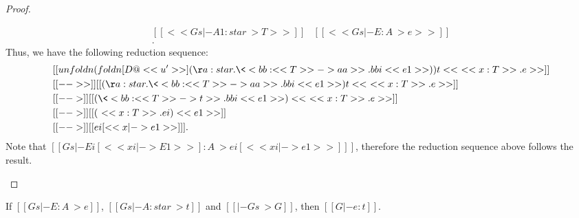 \begin{proof}
\begin{description}
\[\begin{array}{ll}
                [[<<Gs |- A1 : star ~> T>>]]
                & [[<<Gs |- E : A ~> e>>]] \\
                [[<<e' == \ <<x:T>>.e >>]].
        \end{array} \]
        Thus, we have the following reduction sequence:
        \begin{align*}
            &[[unfoldn (foldn [D@<<u'>>] (\aa:star.\<<bb : <<T>> -> aa >> . bbi
<<e1>>)) t <<\ <<x:T>>.e>>]] \\
            &[[-->>]]  [[(\aa:star.\<<bb : <<T>> -> aa >> . bbi <<e1>>) t <<\
<<x:T>>.e>>]] \\
            &[[-->]]  [[(\<<bb : <<T>> -> t >> . bbi <<e1>>) <<\ <<x:T>>.e>>]]
\\
            &[[-->]]  [[(\ <<x:T>>.ei) <<e1>>]] \\
            &[[-->]]  [[ei [<<x |-> e1>>] ]].
        \end{align*}
        Note that $[[Gs |- Ei [ << xi |-> E1 >> ] : A ~> ei [ << xi |-> e1 >> ]
]]$, therefore the reduction sequence above follows the result.
    \end{description}
\end{proof}

\begin{thm}
If $[[Gs |- E:A ~> e]]$, $[[Gs |- A:star ~> t]]$ and $[[|- Gs ~> G]]$, then
$[[G |- e:t]]$.
\end{thm}


